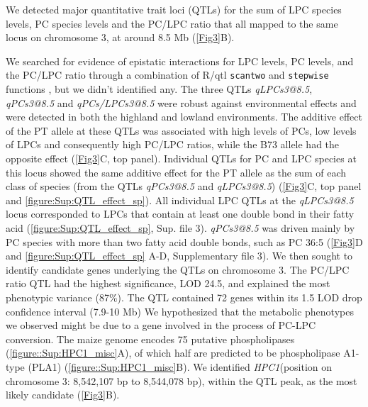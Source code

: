 \documentclass[9pt,twocolumn,twoside,lineno]{biorxiv}
\def\code#1{\texttt{#1}}
\newcommand{\hpc}{\textit{HPC1}\xspace}
\begin{document}
We detected major quantitative trait loci (QTLs) for the sum of LPC species levels, PC species levels and the PC/LPC ratio that all mapped to the same locus on chromosome 3, at around 8.5 Mb (\cref{Fig3}B). 

We searched for evidence of epistatic interactions for LPC levels, PC levels, and the PC/LPC ratio through a combination of R/qtl \code{scantwo} and \code{stepwise} functions \cite{Broman2003-ac}, but we didn't identified any.
The three QTLs \textit{qLPCs3@8.5}, \textit{qPCs3@8.5} and \textit{qPCs/LPCs3@8.5} were robust against environmental effects and were detected in both the highland and lowland environments.
The additive effect of the PT allele at these QTLs was associated with high levels of PCs, low levels of LPCs and consequently high PC/LPC ratios, while the B73 allele had the opposite effect (\cref{Fig3}C, top panel).
Individual QTLs for PC and LPC species at this locus showed the same additive effect for the PT allele as the sum of each class of species (from the QTLs \textit{qPCs3@8.5} and \textit{qLPCs3@8.5}) (\cref{Fig3}C, top panel and \cref{figure:Sup:QTL_effect_sp}). 
All individual LPC QTLs at the \textit{qLPCs3@8.5} locus corresponded to LPCs that contain at least one double bond in their fatty acid (\cref{figure:Sup:QTL_effect_sp}, Sup. file 3).
\textit{qPCs3@8.5} was driven mainly by PC species with more than two fatty acid double bonds, such as PC 36:5 (\cref{Fig3}D and \cref{figure:Sup:QTL_effect_sp} A-D, Supplementary file 3).
We then sought to identify candidate genes underlying the QTLs on chromosome 3.
The PC/LPC ratio QTL had the highest significance, LOD 24.5, and explained the most phenotypic variance (87\%). 
The QTL contained 72 genes within its 1.5 LOD drop confidence interval (7.9-10 Mb) 
We hypothesized that the metabolic phenotypes we observed might be due to a gene involved in the process of PC-LPC conversion.  
The maize genome encodes 75 putative phospholipases (\cref{figure::Sup:HPC1_misc}A), of which half are predicted to be phospholipase A1-type (PLA1) (\cref{figure::Sup:HPC1_misc}B).  
We identified \hpc (position on chromosome 3: 8,542,107 bp to 8,544,078 bp), within the QTL peak, as the most likely candidate (\cref{Fig3}B). 
\end{document}
